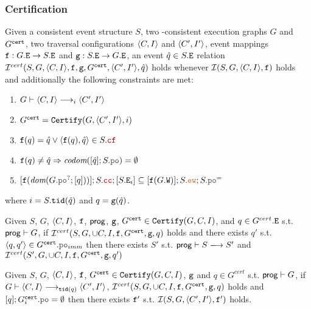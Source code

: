 \documentclass[12pt]{article}
\begin{document}
\subsubsection{Certification}

\begin{definition}
  Given a consistent event structure $S$,
  two \imm-consistent execution graphs $G$ and $G^{{\mathtt{cert}}}$,
  two traversal configurations $\langle C, I \rangle$ and $\langle C', I' \rangle$,
  event mappings ${\mathtt{f}} : G.{\mathtt{E}} \rightarrow S.{\mathtt{E}}$ and ${\mathtt{g}} : S.{\mathtt{E}} \rightarrow G.{\mathtt{E}}$,
  an event $\hat{q} \in S.{\mathtt{E}}$ 
  relation $\mathcal{I}^{cert}(S, G, \langle C, I \rangle, {\mathtt{f}}, {\mathtt{g}}, G^{{\mathtt{cert}}}, \langle C', I' \rangle, \hat{q})$ holds 
  whenever $\mathcal{I}(S, G, \langle C, I \rangle, {\mathtt{f}})$ holds and additionally 
  the following constraints are met:
  \begin{enumerate}[label={$\boldsymbol{\simRc_{\arabic*}}$.},align=left]

    \item \label{item:simc-tr}
    $G \vdash \langle C, I \rangle \longrightarrow_{i} \langle C', I' \rangle$

    \item \label{item:simc-cert}
    $G^{{\mathtt{cert}}} = {\mathtt{Certify}}(G, \langle C', I' \rangle, i)$

    \item \label{item:simc-q}
    $\f(q) = \hat{q} \vee \tup{\f(q), \hat{q}} \in S.\lCF$ 
    
    \item \label{item:simc-po-q}
    $\f(q) \neq \hat{q} \Rightarrow \codom{[\hat{q}];S.\lPO} = \emptyset$

    \item \label{item:simc-cc}
    $[\f(\dom{G.\lPO^?;[q]})];S.\lCC;[S.\lEi{i}] \subseteq
      [\f(G.\lW)];S.\lEW;S.\lPO^=
    $
    
  \end{enumerate}

  where $i = S.{\mathtt{tid}}(\hat{q})$ and $q = {\mathtt{g}}(\hat{q})$.
\end{definition}

\begin{lemma}
  Given $S$, $G$, $\langle C, I \rangle$, ${\mathtt{f}}$, $\mathsf{prog}$,
  ${\mathtt{g}}$, $G^{{\mathtt{cert}}} \in {\mathtt{Certify}}(G, C, I)$, and $q \in G^{cert}.{\mathtt{E}}$
  s.t. $\mathsf{prog} \vdash G$,
  if $\mathcal{I}^{cert}(S, G, \cup{C, I}, {\mathtt{f}}, G^{{\mathtt{cert}}}, {\mathtt{g}}, q)$ holds 
  and there exists $q'$ s.t. $\tup{q, q'} \in G^{\cert}.\lPO_{imm}$
  then there exists $S'$ s.t. $\Prog \vdash S \esstep{} S'$ and
  $\mathcal{I}^{cert}(S', G, \cup{C, I}, {\mathtt{f}}, G^{{\mathtt{cert}}}, {\mathtt{g}}, q')$
\end{lemma}

\begin{lemma}
  Given $S$, $G$, $\langle C, I \rangle$, ${\mathtt{f}}$, 
  $G^{{\mathtt{cert}}} \in {\mathtt{Certify}}(G, C, I)$, ${\mathtt{g}}$ and $q \in G^{cert}$
  s.t. $\mathsf{prog} \vdash G$, if $G \vdash \langle C, I \rangle \longrightarrow_{{\mathtt{tid}}(q)} \langle C', I' \rangle$, 
  $\mathcal{I}^{cert}(S, G, \cup{C, I}, {\mathtt{f}}, G^{{\mathtt{cert}}}, {\mathtt{g}}, q)$ holds 
  and $[q];G_{i}^{\cert}.\lPO = \emptyset$ then there exists
  ${\mathtt{f}}'$ s.t. $\mathcal{I}(S, G, \langle C', I' \rangle, {\mathtt{f}}')$ holds.
\end{lemma}
\end{document}
